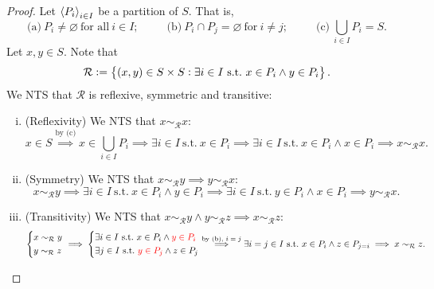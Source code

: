 \documentclass[11pt,openany]{article}
\begin{document}
\begin{proof}
	Let $\left\langle P_i \right\rangle_{i\in I}$ be a partition of $S$. That is, \[
	\text{(a)}\ P_i\neq\varnothing\ \text{for all}\ i\in I;\hspace{30pt}
	\text{(b)}\ P_i\cap P_j=\varnothing\ \text{for}\ i\neq j;\hspace{30pt}
	\text{(c)}\ \bigcup_{i\in I}P_i=S.
	\]
	Let $x,y\in S$. Note that \[
	\mathcal{R}:=\set{(x,y)\in S\times S: \exists i\in I\ \text{s.t.}\ x\in P_i\land y\in P_i}.
	\] We NTS that $\mathcal{R}$ is reflexive, symmetric and transitive:
	\begin{enumerate}[(i)]
		\item (Reflexivity) We NTS that $x\sim_{\mathcal{R}} x$: \[
		x\in S\overset{\text{by (c)}}{\implies} x\in \bigcup_{i\in I}P_i\implies \exists i\in I\ \text{s.t.}\ x\in P_i\implies \exists i\in I\ \text{s.t.}\ x\in P_i\land x\in P_i\implies x\sim_{\mathcal{R}} x.
		\]
		\item (Symmetry) We NTS that $x\sim_{\mathcal{R}} y\implies y\sim_{\mathcal{R}} x$:\[
		x\sim_{\mathcal{R}} y\implies \exists i\in I\ \text{s.t.}\ x\in P_i\land y\in P_i\implies \exists i\in I\ \text{s.t.}\ y\in P_i\land x\in P_i\implies y\sim_{\mathcal{R}} x.
		\]
		\item (Transitivity) We NTS that $x\sim_{\mathcal{R}} y\land y\sim_{\mathcal{R}} z\implies x\sim_{\mathcal{R}} z$:\[
		\begin{cases*}
			x\sim_{\mathcal{R}} y \\
			y\sim_{\mathcal{R}} z
		\end{cases*}\implies \begin{cases*}
		\exists i\in I\ \text{s.t.}\ x\in P_i\land \textcolor{red}{y\in P_i} \\
		\exists j\in I\ \text{s.t.}\ \textcolor{red}{y\in P_j}\land z\in P_j
	\end{cases*}\overset{\text{by (b), $i=j$}}{\implies}\exists i=j\in I\ \text{s.t.}\ x\in P_i\land z\in P_{j=i}\implies x\sim_{\mathcal{R}} z.
		\]
	\end{enumerate}
\end{proof}

%	
\end{document}

